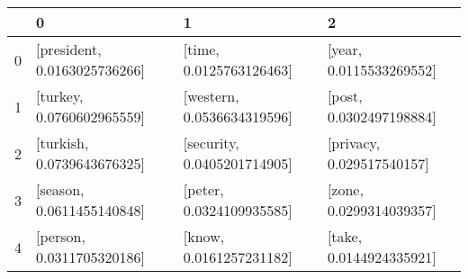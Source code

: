\begin{tabular}{llll}
\toprule
{} &                             0 &                            1 &                          2 \\
\midrule
0 &  [president, 0.0163025736266] &      [time, 0.0125763126463] &    [year, 0.0115533269552] \\
1 &     [turkey, 0.0760602965559] &   [western, 0.0536634319596] &    [post, 0.0302497198884] \\
2 &    [turkish, 0.0739643676325] &  [security, 0.0405201714905] &  [privacy, 0.029517540157] \\
3 &     [season, 0.0611455140848] &     [peter, 0.0324109935585] &    [zone, 0.0299314039357] \\
4 &     [person, 0.0311705320186] &      [know, 0.0161257231182] &    [take, 0.0144924335921] \\
\bottomrule
\end{tabular}
